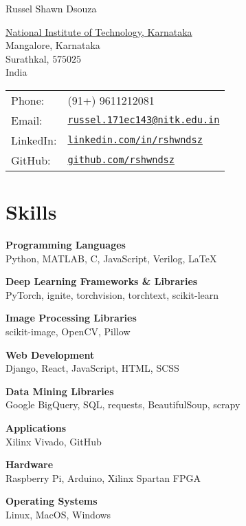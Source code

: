 \documentclass[letterpaper]{article}
\def\name{Russel Shawn Dsouza}
\renewenvironment{itemize}{
  \begin{list}{}{
    \setlength{\leftmargin}{1.5em}
  }
}{
  \end{list}
}
\begin{document}
{\huge \name}


\vspace{0.25in}

\begin{minipage}{0.45\linewidth}
  \href{http://www.nitk.ac.in/}{National Institute of Technology, Karnataka} \\
  Mangalore, Karnataka \\
  Surathkal, $575025$\\
  India
\end{minipage}
\hfill
\begin{minipage}{0.45\linewidth}
  \begin{tabular}{ll}
    Phone: & (91+) 9611212081 \\
    Email: & \href{mailto:russel.171ec143@nitk.edu.in}{\tt russel.171ec143@nitk.edu.in} \\
    LinkedIn: & \href{https://www.linkedin.com/in/rshwndsz}{\tt linkedin.com/in/rshwndsz} \\
    GitHub: & \href{https://www.github.com/rshwndsz}{\tt github.com/rshwndsz}
  \end{tabular}
\end{minipage}

\section*{Skills}
  \begin{itemize}
    \item \textbf{Programming Languages}\\ 
    Python, MATLAB, C, JavaScript, Verilog, \LaTeX
    \item \textbf{Deep Learning Frameworks \& Libraries}\\ 
    PyTorch, ignite, torchvision, torchtext, scikit-learn
    \item \textbf{Image Processing Libraries}\\
    scikit-image, OpenCV, Pillow
    \item \textbf{Web Development}\\
    Django, React, JavaScript, HTML, SCSS
    \item \textbf{Data Mining Libraries}\\
    Google BigQuery, SQL, requests, BeautifulSoup, scrapy
    \item \textbf{Applications}\\
    Xilinx Vivado, GitHub
    \item \textbf{Hardware}\\
    Raspberry Pi, Arduino, Xilinx Spartan FPGA
    \item \textbf{Operating Systems}\\
    Linux, MacOS, Windows
  \end{itemize}
\end{document}
